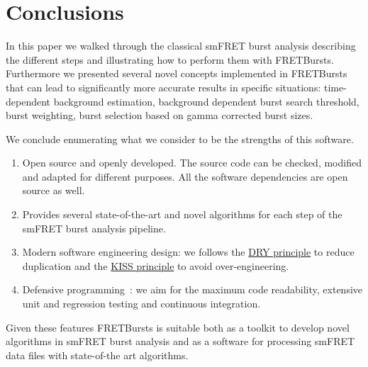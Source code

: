 \section{Conclusions}
\label{sec:conclusions}

In this paper we walked through the classical smFRET burst analysis describing
the different steps and illustrating how to perform them with FRETBursts.
Furthermore we presented several novel concepts implemented in FRETBursts that 
can lead to significantly more accurate results in specific situations: 
time-dependent background estimation, background dependent burst search threshold,
burst weighting, burst selection based on gamma corrected burst sizes. 

We conclude enumerating what we consider to be the strengths
of this software.

\begin{enumerate}
\item Open source and openly developed. The source code can be checked, modified and
adapted for different purposes. All the software dependencies are open source as well.
\item Provides several state-of-the-art and novel algorithms for each step of the 
smFRET burst analysis pipeline. 
\item Modern software engineering design: we follows the \href{http://en.wikipedia.org/wiki/Don\%27t_repeat_yourself}{DRY principle} to reduce duplication and the \href{http://en.wikipedia.org/wiki/KISS_principle}{KISS principle} to avoid over-engineering.
\item Defensive programming~\cite{Prli__2012}: we aim for the maximum code readability,
extensive unit and regression testing and continuous integration.
\end{enumerate}

Given these features FRETBursts is suitable both as a toolkit to develop novel algorithms
in smFRET burst analysis and as a software for processing smFRET data files with
state-of-the art algorithms.
